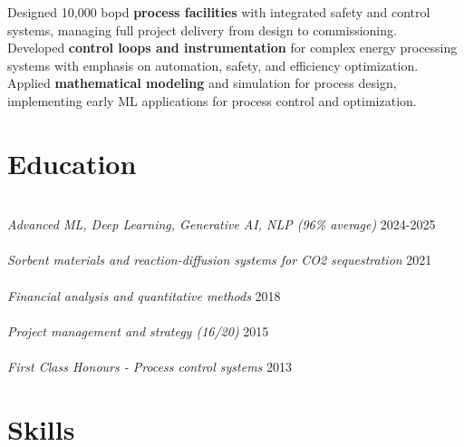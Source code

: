 \documentclass{../templates/karthicv-single}
\begin{document}
{Designed 10,000 bopd \textbf{process facilities} with integrated safety and control systems, managing full project delivery from design to commissioning.\\
Developed \textbf{control loops and instrumentation} for complex energy processing systems with emphasis on automation, safety, and efficiency optimization.\\
Applied \textbf{mathematical modeling} and simulation for process design, implementing early ML applications for process control and optimization.}

\section{Education}
\\
\textit{Advanced ML, Deep Learning, Generative AI, NLP (96\% average)} \hfill 2024-2025\\
\\
\textit{Sorbent materials and reaction-diffusion systems for CO2 sequestration} \hfill 2021\\
\\
\textit{Financial analysis and quantitative methods} \hfill 2018\\
\\
\textit{Project management and strategy (16/20)} \hfill 2015\\
\\
\textit{First Class Honours - Process control systems} \hfill 2013\\

\section{Skills}
\end{document}

